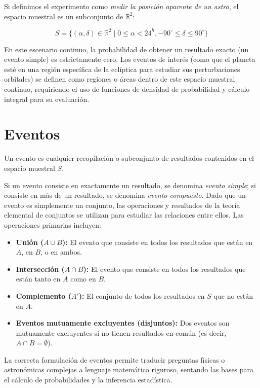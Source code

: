 Si definimos el experimento como \textit{medir la posición aparente de un astro}, el espacio muestral es un subconjunto de $\mathbb{R}^2$:

$$ S = \{ (\alpha, \delta) \in \mathbb{R}^2 \mid 0 \le \alpha < 24^h, -90^\circ \le \delta \le 90^\circ \} $$

En este escenario continuo, la probabilidad de obtener un resultado exacto (un evento simple) es estrictamente cero. Los eventos de interés (como que el planeta esté en una región específica de la eclíptica para estudiar sus perturbaciones orbitales) se definen como regiones o áreas dentro de este espacio muestral continuo, requiriendo el uso de funciones de densidad de probabilidad y cálculo integral para su evaluación.

\section{Eventos}

Un evento es cualquier recopilación o subconjunto de resultados contenidos en el espacio muestral $S$. 

Si un evento consiste en exactamente un resultado, se denomina \textit{evento simple}; si consiste en más de un resultado, se denomina \textit{evento compuesto}. Dado que un evento es simplemente un conjunto, las operaciones y resultados de la teoría elemental de conjuntos se utilizan para estudiar las relaciones entre ellos. Las operaciones primarias incluyen:
\begin{itemize}
    \item \textbf{Unión ($A \cup B$):} El evento que consiste en todos los resultados que están en $A$, en $B$, o en ambos.
    \item \textbf{Intersección ($A \cap B$):} El evento que consiste en todos los resultados que están tanto en $A$ como en $B$.
    \item \textbf{Complemento ($A'$):} El conjunto de todos los resultados en $S$ que no están en $A$.
    \item \textbf{Eventos mutuamente excluyentes (disjuntos):} Dos eventos son mutuamente excluyentes si no tienen resultados en común (es decir, $A \cap B = \emptyset$).
\end{itemize}

La correcta formulación de eventos permite traducir preguntas físicas o astronómicas complejas a lenguaje matemático riguroso, sentando las bases para el cálculo de probabilidades y la inferencia estadística.

